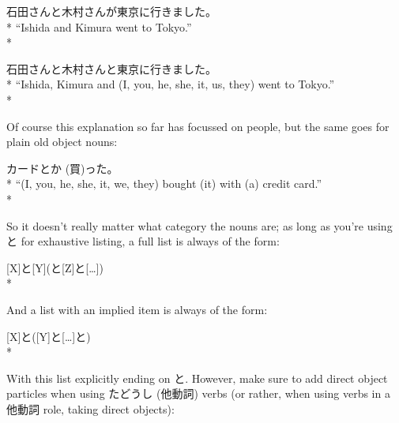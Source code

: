 \documentclass[11pt, b5paper, twoside, openright, onecolumn]{book}
\makeatletter
\newcommand*{\rubystack}[2]{{\relscale{0.5}%
  \begin{tabular}[b]{@{}c@{}}%
    {#1}\\%
   {\textscale{2}{#2}}%
  \end{tabular}}%
}
\DeclareRobustCommand*{\ruby}[2]{%
  \mbox{%
    \setlength{\parskip}{0ex}%
    \BeginAccSupp{method=pdfstringdef,ActualText={#1}}%
      \rubystack{\phantom{#2}}{#1}%
      \llap{%
        \rubystack{#2}{\phantom{#1}}%
      }%
    \EndAccSupp{}%
  }%
}
\renewcommand*{\ruby}[2]{#2 (#1)}%
\newenvironment{exampleblock}{
\setlength{\parindent}{0.6in}
\begin{minipage}[t]{\dimexpr\textwidth-\parindent}}
{\end{minipage}}
\makeatother
\begin{document}
\vspace{0.4cm}
\begin{exampleblock}
石田さんと木村さんが東京に行きました。 \\* 
“Ishida and Kimura went to Tokyo.” \\* 
\end{exampleblock}
\vspace{0.2cm}

\begin{exampleblock}
石田さんと木村さんと東京に行きました。 \\* 
“Ishida‚ Kimura and (I‚ you‚ he‚ she‚ it‚ us‚ they) went to Tokyo.” \\* 
\end{exampleblock}
\vspace{0.2cm}

Of course this explanation so far has focussed on people‚ but the same goes for plain old object nouns:

\vspace{0.4cm}
\begin{exampleblock}
カードと\ruby{買}{か}った。 \\* 
“(I‚ you‚ he‚ she‚ it‚ we‚ they) bought (it) with (a) credit card.” \\* 
\end{exampleblock}
\vspace{0.2cm}

So it doesn’t really matter what category the nouns are; as long as you’re using と for exhaustive listing‚ a full list is always of the form:

\vspace{0.4cm}
\begin{exampleblock}
[X]と[Y](と[Z]と[…]) \\* 
\end{exampleblock}
\vspace{0.2cm}

And a list with an implied item is always of the form:

\vspace{0.4cm}
\begin{exampleblock}
[X]と([Y]と[…]と) \\* 
\end{exampleblock}
\vspace{0.2cm}

With this list explicitly ending on と. However‚ make sure to add direct object particles when using \ruby{他動詞}{たどうし} verbs (or rather‚ when using verbs in a 他動詞 role‚ taking direct objects):
\end{document}
